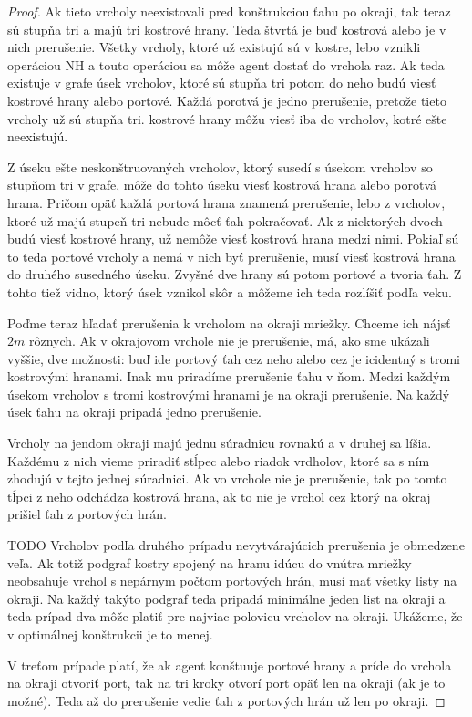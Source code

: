 \begin{proof}
Ak tieto vrcholy neexistovali pred konštrukciou
ťahu po okraji, tak teraz sú stupňa tri a majú tri kostrové hrany. Teda
štvrtá je buď kostrová alebo je v nich prerušenie.
Všetky vrcholy, ktoré už existujú sú v kostre, lebo vznikli operáciou NH a
touto operáciou sa môže agent dostať do vrchola raz. Ak teda existuje v
grafe úsek
vrcholov, ktoré sú stupňa tri potom do neho budú viesť kostrové hrany alebo
portové. Každá porotvá je jedno prerušenie, pretože tieto vrcholy už sú
stupňa tri. kostrové hrany môžu viesť iba do vrcholov, kotré ešte
neexistujú.

Z úseku ešte neskonštruovaných vrcholov, ktorý susedí s úsekom vrcholov so
stupňom tri v grafe, môže do tohto úseku viesť kostrová hrana alebo porotvá
hrana. Pričom opäť každá portová hrana znamená prerušenie, lebo z vrcholov,
ktoré už majú stupeň tri nebude môcť ťah pokračovať. Ak z niektorých dvoch
budú viesť kostrové hrany, už nemôže viesť kostrová hrana medzi nimi. Pokiaľ
sú to teda portové vrcholy a nemá v nich byť prerušenie, musí viesť kostrová
hrana do druhého susedného úseku. Zvyšné dve hrany sú potom portové a tvoria
ťah. Z tohto tiež vidno, ktorý úsek vznikol skôr a môžeme ich teda rozlíšiť
podľa veku.

Poďme teraz hľadať prerušenia k vrcholom na  okraji mriežky. 
Chceme ich nájsť $2m$ rôznych. Ak
v okrajovom vrchole nie je prerušenie, má, ako sme ukázali vyššie, 
dve možnosti: 
buď ide portový ťah cez neho alebo cez je icidentný s tromi kostrovými
hranami. Inak mu priradíme prerušenie ťahu v ňom. Medzi každým úsekom
vrcholov s tromi kostrovými hranami je na okraji prerušenie. Na každý úsek
ťahu na okraji pripadá jedno prerušenie.

Vrcholy na jendom okraji majú jednu súradnicu rovnakú a v druhej sa líšia.
Každému z nich vieme priradiť stĺpec alebo riadok vrdholov, ktoré sa s ním
zhodujú v tejto jednej súradnici. Ak vo vrchole nie je prerušenie, tak po
tomto tĺpci z neho odchádza kostrová hrana, ak to nie je vrchol cez ktorý na
okraj prišiel ťah z portových hrán.


TODO
\iffalse
Vrcholov podľa druhého prípadu nevytvárajúcich prerušenia je obmedzene veľa.
Ak totiž podgraf kostry spojený na hranu idúcu do vnútra mriežky neobsahuje
vrchol s nepárnym počtom portových hrán, musí mať všetky listy na okraji.
Na každý takýto podgraf teda pripadá minimálne jeden list na okraji a teda
prípad dva môže platiť pre najviac polovicu vrcholov na okraji. Ukážeme, že
v optimálnej konštrukcii je to menej.

V treťom prípade platí, že ak agent konštuuje portové hrany a príde do
vrchola na okraji otvoriť port, tak na tri kroky otvorí port opäť len na
okraji (ak je to možné). Teda až do prerušenie vedie ťah z portových hrán už
len po okraji.


\end{proof}
